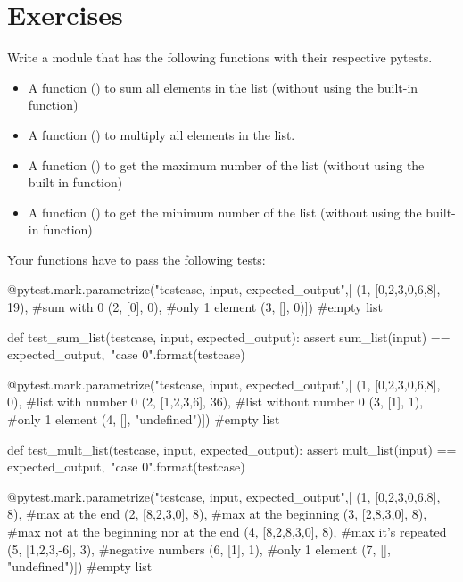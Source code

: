 \section*{Exercises}

\begin{exercise}
Write a  module that has the following functions with their respective pytests.

\begin{itemize}
\item A function () to sum all elements in the list (without using the  built-in function)
\item A function () to multiply all elements in the list.
\item A function () to get the maximum number of the list (without using the  built-in function)
\item A function () to get the minimum number of the list (without using the  built-in function)
\end{itemize}

Your functions have to pass the following tests:\\

\begin{small}
\begin{python}
@pytest.mark.parametrize("testcase, input, expected_output",[
(1, [0,2,3,0,6,8], 19),         #sum with 0
(2, [0], 0),                    #only 1 element
(3, [], 0)])                    #empty list

def test_sum_list(testcase, input, expected_output):
    assert sum_list(input) == expected_output,\
           "case {0}".format(testcase)
    
@pytest.mark.parametrize("testcase, input, expected_output",[
(1, [0,2,3,0,6,8], 0),          #list with number 0
(2, [1,2,3,6], 36),             #list without number 0
(3, [1], 1),                    #only 1 element
(4, [], "undefined")])          #empty list

def test_mult_list(testcase, input, expected_output):
    assert mult_list(input) == expected_output,\
           "case {0}".format(testcase)
    
@pytest.mark.parametrize("testcase, input, expected_output",[
(1, [0,2,3,0,6,8], 8),          #max at the end
(2, [8,2,3,0], 8),              #max at the beginning
(3, [2,8,3,0], 8),              #max not at the beginning nor at the end
(4, [8,2,8,3,0], 8),            #max it's repeated
(5, [1,2,3,-6], 3),             #negative numbers
(6, [1], 1),                    #only 1 element
(7, [], "undefined")])          #empty list


\end{python}
\end{small}
\end{exercise}
